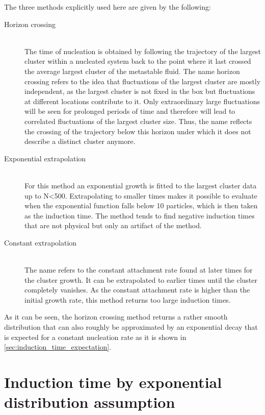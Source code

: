 The three methods explicitly used here are given by the following:
\begin{description}
\item[Horizon crossing]{\hfill \\The time of nucleation is obtained by following the trajectory of the largest cluster within a nucleated system back to the point where it last crossed the average largest cluster of the metastable fluid. The name horizon crossing refers to the idea that fluctuations of the largest cluster are mostly independent, as the largest cluster is not fixed in the box but fluctuations at different locations contribute to it. Only extraordinary large fluctuations will be seen for prolonged periods of time and therefore will lead to correlated fluctuations of the largest cluster size. Thus, the name reflects the crossing of the trajectory below this horizon under which it does not describe a distinct cluster anymore.}

\item[Exponential extrapolation]{\hfill \\For this method an exponential growth is fitted to the largest cluster data up to N<500. Extrapolating to smaller times makes it possible to evaluate when the exponential function falls below 10 particles, which is then taken as the induction time. The method tends to find negative induction times that are not physical but only an artifact of the method.}

\item[Constant extrapolation]{\hfill \\The name refers to the constant attachment rate found at later times for the cluster growth. It can be extrapolated to earlier times until the cluster completely vanishes. As the constant attachment rate is higher than the initial growth rate, this method returns too large induction times.}
\end{description}

As it can be seen, the horizon crossing method returns a rather smooth distribution that can also roughly be approximated by an exponential decay that is expected for a constant nucleation rate as it is shown in \autoref{sec:induction_time_expectation}.

\section{Induction time by exponential distribution assumption}
\label{sec:induction_times}
